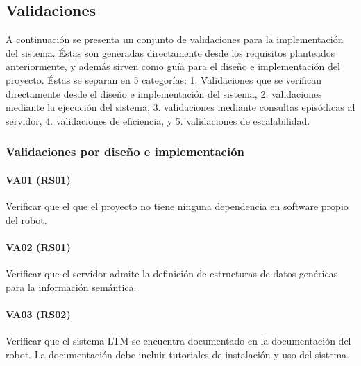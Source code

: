 

\subsection{Validaciones}

A continuación se presenta un conjunto de validaciones para la implementación del sistema. Éstas son generadas directamente desde los requisitos planteados anteriormente, y además sirven como guía para el diseño e implementación del proyecto. Éstas se separan en 5 categorías: 1. Validaciones que se verifican directamente desde el diseño e implementación del sistema, 2. validaciones mediante la ejecución del sistema, 3. validaciones mediante consultas episódicas al servidor, 4. validaciones de eficiencia, y 5. validaciones de escalabilidad.


\subsubsection{Validaciones por diseño e implementación}
\paragraph{VA01 (RS01)}
Verificar que el que el proyecto no tiene ninguna dependencia en software propio del robot.

\paragraph{VA02 (RS01)}
Verificar que el servidor admite la definición de estructuras de datos genéricas para la información semántica.

\paragraph{VA03 (RS02)}
Verificar que el sistema LTM se encuentra documentado en la documentación del robot. La documentación debe incluir tutoriales de instalación y uso del sistema.

